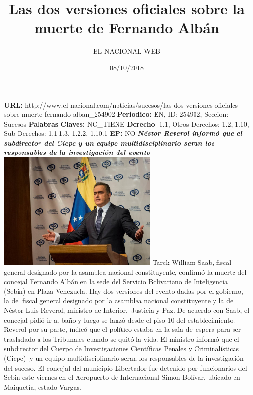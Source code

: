\documentclass{article}%
\title{\textbf{Las dos versiones oficiales sobre la muerte de Fernando Albán}}%
\author{EL NACIONAL WEB}%
\date{08/10/2018}%
\begin{document}
%
\normalsize%
\maketitle%
\textbf{URL: }%
http://www.el{-}nacional.com/noticias/sucesos/las{-}dos{-}versiones{-}oficiales{-}sobre{-}muerte{-}fernando{-}alban\_254902\newline%
%
\textbf{Periodico: }%
EN, %
ID: %
254902, %
Seccion: %
Sucesos\newline%
%
\textbf{Palabras Claves: }%
NO\_TIENE\newline%
%
\textbf{Derecho: }%
1.1, %
Otros Derechos: %
1.2, 1.10, %
Sub Derechos: %
1.1.1.3, 1.2.2, 1.10.1\newline%
%
\textbf{EP: }%
NO\newline%
\newline%
%
\textbf{\textit{Néstor Reverol informó que el subdirector del Cicpc y un equipo multidisciplinario seran los responsables de la investigación del evento~}}%
\newline%
\newline%
%
\includegraphics[width=300px]{228.jpg}%
\newline%
%
Tarek William Saab, fiscal general designado por la asamblea nacional constituyente, confirmó la muerte del concejal Fernando Albán en la sede del Servicio Bolivariano de Inteligencia (Sebin) en Plaza Venezuela.%
\newline%
%
Hay dos versiones del evento dadas por el gobierno, la del fiscal general designado por la asamblea nacional constituyente y la de Néstor Luis Reverol, ministro de Interior,~Justicia y Paz.%
\newline%
%
De acuerdo con Saab, el concejal pidió ir al baño y luego se lanzó desde el piso 10 del establecimiento. Reverol por su parte, indicó que el político estaba en la sala de~espera para ser trasladado a los Tribunales cuando se quitó la vida.%
\newline%
%
El ministro informó que el subdirector del Cuerpo de Investigaciones Científicas Penales y Criminalísticas (Cicpc)~y un equipo multidisciplinario seran los responsables de la investigación del suceso.%
\newline%
%
El concejal del municipio Libertador fue detenido por funcionarios del Sebin este viernes en el Aeropuerto de Internacional Simón Bolívar, ubicado en Maiquetía, estado Vargas.%
\newline%
%
\end{document}
